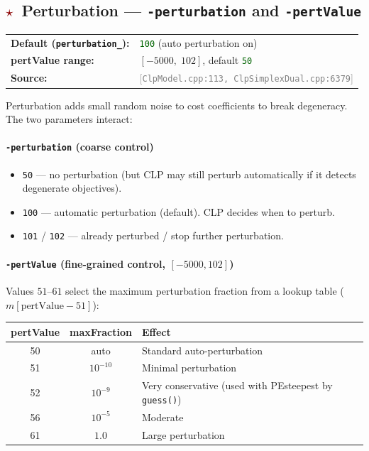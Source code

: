 \documentclass[11pt,a4paper]{article}
\newcommand{\param}[1]{\texttt{\textbf{#1}}}
\newcommand{\val}[1]{\texttt{#1}}
\newcommand{\src}[1]{\textcolor{gray}{\small[\texttt{#1}]}}
\newcommand{\default}[1]{\textcolor{darkgreen}{\texttt{#1}}}
\newcommand{\important}{\textcolor{darkred}{\textbf{$\star$}}}
\begin{document}
\subsection{\important\ Perturbation --- \param{-perturbation} and \param{-pertValue}}

\begin{tabular}{@{}ll@{}}
  \textbf{Default (\texttt{perturbation\_}):} & \default{100} (auto perturbation on) \\
  \textbf{pertValue range:} & $[-5000,\; 102]$, default \default{50} \\
  \textbf{Source:}  & \src{ClpModel.cpp:113, ClpSimplexDual.cpp:6379}
\end{tabular}

\medskip
Perturbation adds small random noise to cost coefficients to break degeneracy.
The two parameters interact:

\paragraph{\param{-perturbation} (coarse control)}
\begin{itemize}[noitemsep]
  \item \val{50} --- no perturbation (but CLP may still perturb automatically
        if it detects degenerate objectives).
  \item \val{100} --- automatic perturbation (default). CLP decides when to perturb.
  \item \val{101} / \val{102} --- already perturbed / stop further perturbation.
\end{itemize}

\paragraph{\param{-pertValue} (fine-grained control, $[-5000, 102]$)}
Values $51$--$61$ select the maximum perturbation fraction from a lookup table
($m[\text{pertValue} - 51]$):

\begin{center}
\begin{tabular}{@{}ccl@{}}
  \toprule
  \textbf{pertValue} & \textbf{maxFraction} & \textbf{Effect} \\
  \midrule
  50  & auto    & Standard auto-perturbation \\
  51  & $10^{-10}$ & Minimal perturbation \\
  52  & $10^{-9}$  & Very conservative (used with PEsteepest by \texttt{guess()}) \\
  56  & $10^{-5}$  & Moderate \\
  61  & $1.0$      & Large perturbation \\
  \bottomrule
\end{tabular}
\end{center}
\end{document}
